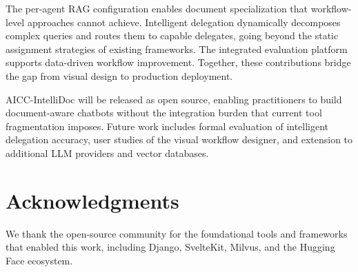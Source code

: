 \documentclass[11pt]{article}
\begin{document}
The per-agent RAG configuration enables document specialization that workflow-level approaches cannot achieve. Intelligent delegation dynamically decomposes complex queries and routes them to capable delegates, going beyond the static assignment strategies of existing frameworks. The integrated evaluation platform supports data-driven workflow improvement. Together, these contributions bridge the gap from visual design to production deployment.

AICC-IntelliDoc will be released as open source, enabling practitioners to build document-aware chatbots without the integration burden that current tool fragmentation imposes. Future work includes formal evaluation of intelligent delegation accuracy, user studies of the visual workflow designer, and extension to additional LLM providers and vector databases.


\section*{Acknowledgments}

We thank the open-source community for the foundational tools and frameworks that enabled this work, including Django, SvelteKit, Milvus, and the Hugging Face ecosystem.




\end{document}
